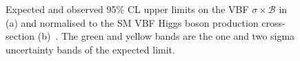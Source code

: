 \begin{figure}

  \caption{Expected and observed 95\% \ac{CL} upper limits on the \ac{VBF} $\sigma\times\mathcal{B}$ in \pb (a) and normalised to the SM \ac{VBF} Higgs boson production cross-section (b)~\cite{Chatrchyan:2014tja}. The green and yellow bands are the one and two sigma uncertainty bands of the expected limit.}
  \label{fig:promptlimits}
\end{figure}

